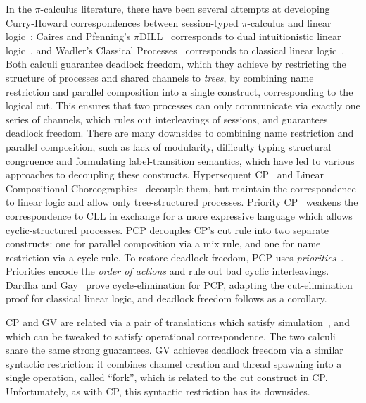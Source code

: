 In the $\pi$-calculus literature, there have been several attempts at developing Curry-Howard correspondences between session-typed $\pi$-calculus and linear logic~\cite{girard87}: Caires and Pfenning's $\pi$DILL~\cite{cairespfenning10} corresponds to dual intuitionistic linear logic~\cite{barber96}, and Wadler's Classical Processes~\cite[CP]{wadler14} corresponds to classical linear logic~\cite[CLL]{girard87}. Both calculi guarantee deadlock freedom, which they achieve by restricting the structure of processes and shared channels to \emph{trees}, by combining name restriction and parallel composition into a single construct, corresponding to the logical cut. This ensures that two processes can only communicate via exactly one series of channels, which rules out interleavings of sessions, and guarantees deadlock freedom.
There are many downsides to combining name restriction and parallel composition, such as lack of modularity, difficulty typing structural congruence and formulating label-transition semantics, which have led to various approaches to decoupling these constructs. Hypersequent CP~\cite{MP18,kokkemontesi19popl,kokkemontesi19tlla} and Linear Compositional Choreographies~\cite{CarboneMS18} decouple them, but maintain the correspondence to linear logic and allow only tree-structured processes. Priority CP~\cite[PCP]{dardhagay18extended} weakens the correspondence to CLL in exchange for a more expressive language which allows cyclic-structured processes. PCP decouples CP's cut rule into two separate constructs: one for parallel composition via a mix rule, and one for name restriction via a cycle rule. To restore deadlock freedom, PCP uses \emph{priorities}~\cite{kobayashi06,padovani14}. Priorities encode the \emph{order of actions} and rule out bad cyclic interleavings. Dardha and Gay~\cite{dardhagay18extended} prove cycle-elimination for PCP, adapting the cut-elimination proof for classical linear logic, and deadlock freedom follows as a corollary.

CP and GV are related via a pair of translations which satisfy simulation~\cite{lindleymorris16}, and which can be tweaked to satisfy operational correspondence. The two calculi share the same strong guarantees. GV achieves deadlock freedom via a similar syntactic restriction: it combines channel creation and thread spawning into a single operation, called ``fork'', which is related to the cut construct in CP. Unfortunately, as with CP, this syntactic restriction has its downsides.

